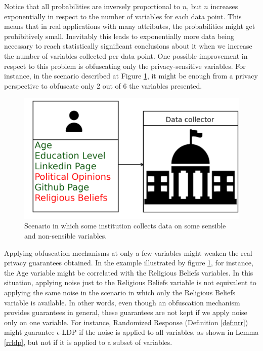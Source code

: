 \documentclass[conference]{IEEEtran}
\begin{document}
Notice that all probabilities are inversely proportional to $n$, but $n$ increases exponentially in respect to the number of variables for each data point. This means that in real applications with many attributes, the probabilities might get prohibitively small. Inevitably this leads to exponentially more data being necessary to reach statistically significant conclusions about it when we increase the number of variables collected per data point. One possible improvement in respect to this problem is obfuscating only the privacy-sensitive variables. For instance, in the scenario described at Figure \ref{fig:sensitiveVars}, it might be enough from a privacy perspective to obfuscate only 2 out of 6 the variables presented.


\begin{figure}[ht]
\centering
\includegraphics[width=\columnwidth]{sensitiveVars}
\caption{Scenario in which some institution collects data on some sensible and non-sensible variables.}\label{fig:sensitiveVars}
\end{figure}

Applying obfuscation mechanisms at only a few variables might weaken the real privacy guarantees obtained. In the example illustrated by figure \ref{fig:sensitiveVars}, for instance, the Age variable might be correlated with the Religious Beliefs variables. In this situation, applying noise just to the Religious Beliefs variable is not equivalent to applying the same noise in the scenario in which only the Religious Beliefs variable is available. In other words, even though an obfuscation mechanism provides guarantees in general, these guarantees are not kept if we apply noise only on one variable. For instance, Randomized Response (Definition \ref{def:nrr}) might guarantee $\epsilon$-LDP if the noise is applied to all variables, as shown in Lemma \ref{rrldp}, but not if it is applied to a subset of variables.
\end{document}
